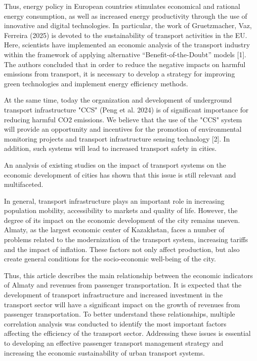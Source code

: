 Thus, energy policy in European countries stimulates economical and
rational energy consumption, as well as increased energy productivity
through the use of innovative and digital technologies. In particular,
the work of Gruetzmacher, Vaz, Ferreira (2025) is devoted to the
sustainability of transport activities in the EU. Here, scientists have
implemented an economic analysis of the transport industry within the
framework of applying alternative ``Benefit-of-the-Doubt'' models
{[}1{]}. The authors concluded that in order to reduce the negative
impacts on harmful emissions from transport, it is necessary to develop
a strategy for improving green technologies and implement energy
efficiency methods.

At the same time, today the organization and development of underground
transport infrastructure "CCS" (Peng et al. 2024) is of significant
importance for reducing harmful CO2 emissions. We believe that the use
of the "CCS" system will provide an opportunity and incentives for the
promotion of environmental monitoring projects and transport
infrastructure sensing technology {[}2{]}. In addition, such systems
will lead to increased transport safety in cities.

An analysis of existing studies on the impact of transport systems on
the economic development of cities has shown that this issue is still
relevant and multifaceted.

In general, transport infrastructure plays an important role in
increasing population mobility, accessibility to markets and quality of
life. However, the degree of its impact on the economic development of
the city remains uneven. Almaty, as the largest economic center of
Kazakhstan, faces a number of problems related to the modernization of
the transport system, increasing tariffs and the impact of inflation.
These factors not only affect production, but also create general
conditions for the socio-economic well-being of the city.

Thus, this article describes the main relationship between the economic
indicators of Almaty and revenues from passenger transportation. It is
expected that the development of transport infrastructure and increased
investment in the transport sector will have a significant impact on the
growth of revenues from passenger transportation. To better understand
these relationships, multiple correlation analysis was conducted to
identify the most important factors affecting the efficiency of the
transport sector. Addressing these issues is essential to developing an
effective passenger transport management strategy and increasing the
economic sustainability of urban transport systems.

